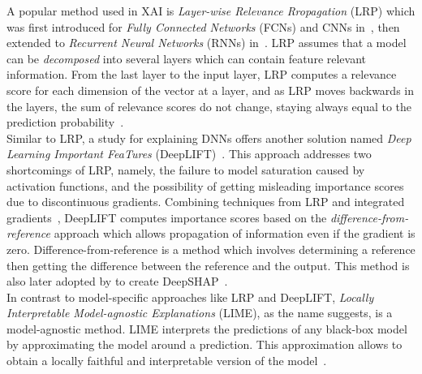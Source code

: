 A popular method used in XAI is \emph{Layer-wise Relevance Rropagation} (LRP) which was first introduced for \emph{Fully Connected Networks} (FCNs) and CNNs in~\cite{LRP_Lapuschkin}, then extended to \emph{Recurrent Neural Networks} (RNNs) in~\cite{ExplainingRNNs_Arras}. LRP assumes that a model can be \emph{decomposed} into several layers which can contain feature relevant information. From the last layer to the input layer, LRP computes a relevance score for each dimension of the vector at a layer, and as LRP moves backwards in the layers, the sum of relevance scores do not change, staying always equal to the prediction probability~\parencite{LRP_Lapuschkin}.\\
Similar to LRP, a study for explaining DNNs offers another solution named \emph{Deep Learning Important FeaTures} (DeepLIFT)~\parencite{DeepLIFT_Shrikumar}. This approach addresses two shortcomings of LRP, namely, the failure to model saturation caused by activation functions, and the possibility of getting misleading importance scores due to discontinuous gradients. Combining techniques from LRP and integrated gradients~\parencite{GradientsOfCounterfactuals_Sundararajan}, DeepLIFT computes importance scores based on the \emph{difference-from-reference} approach which allows propagation of information even if the gradient is zero. Difference-from-reference is a method which involves determining a reference then getting the difference between the reference and the output. This method is also later adopted by to create DeepSHAP~\parencite{AUnifiedApproach_Lundberg}.\\
In contrast to model-specific approaches like LRP and DeepLIFT, \emph{Locally Interpretable Model-agnostic Explanations} (LIME), as the name suggests, is a model-agnostic method. LIME interprets the predictions of any black-box model by approximating the model around a prediction. This approximation allows to obtain a locally faithful and interpretable version of the model~\parencite{WhyShouldITrustYou_Riberio}.\\
